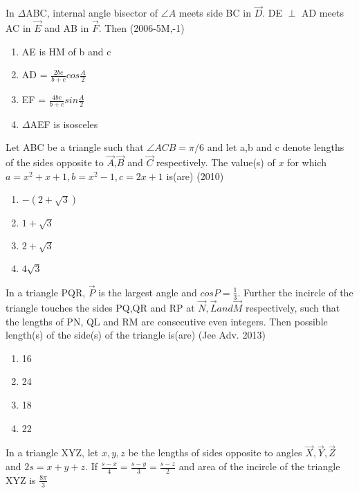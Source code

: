     \item In $\Delta$ABC, internal angle bisector of $\angle A$ meets side BC in $\vec{D}$. DE $\perp$ AD meets AC in $\vec{E}$ and AB in $\vec{F}$. Then
    \hfill{(2006-5M,-1)}
    \begin{enumerate}
    \item AE is HM of b and c
    \item AD = ${\frac{2bc}{b+c}}cos{\frac{A}{2}}$
    \item EF = ${\frac{4bc}{b+c}}sin{\frac{A}{2}}$
    \item $\Delta$AEF is isosceles
    \end{enumerate}
    \item Let ABC be a triangle such that $\angle ACB = \pi/6$ and let a,b and c denote lengths of the sides opposite to $\vec{A}$,$\vec{B}$ and $\vec{C}$ respectively. The value(s) of $x$ for which $a = x^{2}+x+1, b = x^{2}-1, c = 2x+1$ is(are)
    \hfill{(2010)}
    \begin{multicols}{2}
    \begin{enumerate}
    \item $-(2+\sqrt{3})$
    \item $1+\sqrt{3}$
    \item $2+\sqrt{3}$
    \item $4\sqrt{3}$
    \end{enumerate}
    \end{multicols}
    \item In a triangle PQR, $\vec{P}$ is the largest angle and $cosP = \frac{1}{3}$. Further the incircle of the triangle touches the sides PQ,QR and RP at $\vec{N},\vec{L} and \vec{M}$ respectively, such that the lengths of PN, QL and RM are consecutive even integers. Then possible length(s) of the side(s) of the triangle is(are)
    \hfill{(Jee Adv. 2013)}
    \begin{multicols}{2}
    \begin{enumerate}
    \item 16
    \item 24
    \item 18
    \item 22
    \end{enumerate}
    \end{multicols}
    \item In a triangle XYZ, let $x,y,z$ be the lengths of sides opposite to angles $\vec{X},\vec{Y},\vec{Z}$ and $2s = x+y+z$. If ${\frac{s-x}{4}}={\frac{s-y}{3}}={\frac{s-z}{2}}$ and area of the incircle of the triangle XYZ is ${\frac{8\pi}{3}}$
